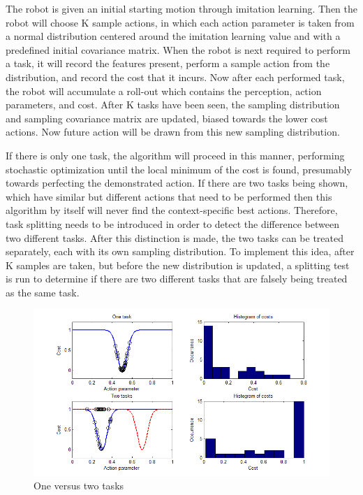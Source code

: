 \documentclass[12pt]{article}
\begin{document}
The robot is given an initial starting motion through imitation learning. Then the robot will choose K sample actions, in which each action parameter is taken from a normal distribution centered around the imitation learning value and with a predefined initial covariance matrix. When the robot is next required to perform a task, it will record the features present, perform a sample action from the distribution, and record the cost that it incurs. Now after each performed task, the robot will accumulate a roll-out which contains the perception, action parameters, and cost. After K tasks have been seen, the sampling distribution and sampling covariance matrix are updated, biased towards the lower cost actions. Now future action will be drawn from this new sampling distribution. 

If there is only one task, the algorithm will proceed in this manner, performing stochastic optimization until the local minimum of the cost is found, presumably towards perfecting the demonstrated action. If there are two tasks being shown, which have similar but different actions that need to be performed then this algorithm by itself will never find the context-specific best actions. Therefore, task splitting needs to be introduced in order to detect the difference between two different tasks. After this distinction is made, the two tasks can be treated separately, each with its own sampling distribution. To implement this idea, after K samples are taken, but before the new distribution is updated, a splitting test is run to determine if there are two different tasks that are falsely being treated as the same task.

\begin{figure}[ht]
  \centering
  \includegraphics[width=0.9\columnwidth]{one_vs_two_tasks.png}
  \caption{One versus two tasks}
  \label{fig:1vs2tasks}
\end{figure} 
\end{document}
